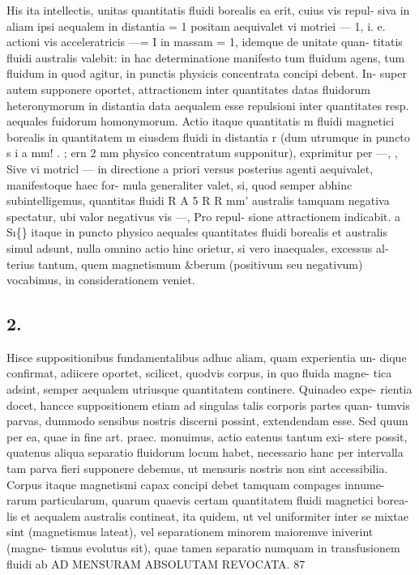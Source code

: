 \documentclass[12pt,a4paper]{article}
\begin{document}
His ita intellectis,     unitas quantitatis fluidi borealis ea erit, cuius vis repul-
siva in aliam ipsi aequalem in distantia = 1 positam aequivalet vi motriei --- 1,
i. e. actioni vis acceleratricis ---= I in massam = 1, idemque de unitate quan-
titatis fluidi australis valebit: in hac determinatione manifesto tum fluidum agens,
tum fluidum in quod agitur, in punctis physicis concentrata concipi debent.  In-
super autem supponere oportet, attractionem inter quantitates datas fluidorum
heteronymorum in distantia data aequalem esse repulsioni inter quantitates resp.
aequales fuidorum homonymorum.                      Actio itaque quantitatis m fluidi magnetici
borealis in quantitatem m eiusdem fluidi in distantia r (dum utrumque in puncto
s                                   i             a              mm!         .       ;          ern     2    mm
physico concentratum supponitur),                  exprimitur per     ---, , Sive vi motricl                   ---
in directione a priori versus           posterius     agenti aequivalet,         manifestoque              haec for-
mula generaliter valet, si, quod semper abhinc subintelligemus,                               quantitas fluidi
R                        A                        5                 R        R       mm'
australis tamquam       negativa spectatur, ubi valor negativus vis                           ---,     Pro repul-
sione attractionem indicabit.                                     a
S\i\{\} itaque in puncto physico aequales quantitates fluidi borealis et australis
simul adsunt,      nulla omnino         actio hinc orietur,      si vero inaequales,                excessus al-
terius tantum, quem magnetismum \&berum (positivum seu negativum) vocabimus,
in considerationem veniet.



\subsection*{2.}

Hisce suppositionibus fundamentalibus adhuc aliam, quam experientia un-
dique confirmat, adiicere oportet, scilicet, quodvis corpus, in quo fluida magne-
tica adsint, semper aequalem utriusque quantitatem continere. Quinadeo expe-
rientia docet, hancce suppositionem etiam ad singulas talis corporis partes quan-
tumvis parvas, dummodo                sensibus     nostris discerni possint, extendendam                         esse.
Sed quum per ea, quae in fine art. praec. monuimus,                         actio eatenus tantum exi-
stere possit, quatenus aliqua separatio fluidorum locum habet, necessario hanc
per intervalla tam parva fieri supponere debemus, ut mensuris nostris non sint
accessibilia.
Corpus itaque magnetismi capax concipi debet tamquam compages innume-
rarum particularum,       quarum quaevis certam quantitatem                      fluidi magnetici borea-
lis et aequalem australis contineat, ita quidem, ut vel uniformiter inter se mixtae
sint (magnetismus lateat), vel separationem minorem maioremve iniverint (magne-
tismus evolutus sit), quae tamen separatio numquam                      in transfusionem fluidi ab
AD MENSURAM   ABSOLUTAM   REVOCATA.                         87
\end{document}

